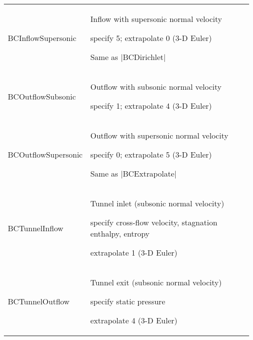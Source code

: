 \begin{longtable}{>{\ttfamily}p{\tmplengtha} >{\raggedright\arraybackslash}p{\Pwidth}}
BCInflowSupersonic      & Inflow with supersonic normal velocity
                          \begin{mylist}
                          \item specify 5; extrapolate 0 (3-D Euler)
                          \end{mylist}
                          Same as |BCDirichlet| \\[0.5\baselineskip]

BCOutflowSubsonic       & Outflow with subsonic normal velocity
                          \begin{mylist}
                          \item specify 1; extrapolate 4 (3-D Euler)
                          \end{mylist}\mbox{}\vspace{-0.5\baselineskip} \\

BCOutflowSupersonic     & Outflow with supersonic normal velocity
                          \begin{mylist}
                          \item specify 0; extrapolate 5 (3-D Euler)
                          \end{mylist}
                          Same as |BCExtrapolate| \\[0.5\baselineskip]

BCTunnelInflow          & Tunnel inlet (subsonic normal velocity)
                          \begin{mylist}
                          \item specify cross-flow velocity, stagnation
                                enthalpy, entropy 
                          \item extrapolate 1 (3-D Euler)
                          \end{mylist}\mbox{}\vspace{-0.5\baselineskip} \\

BCTunnelOutflow         & Tunnel exit (subsonic normal velocity)
                          \begin{mylist}
                          \item specify static pressure
                          \item extrapolate 4 (3-D Euler)
                          \end{mylist}\mbox{}\vspace{-0.5\baselineskip} \\


\end{longtable}
